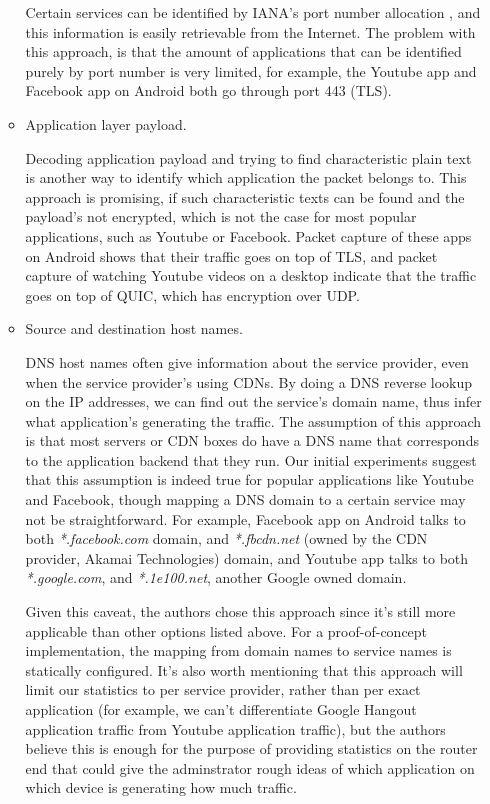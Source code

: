 \begin{itemize}
\begin{itemize}
  Certain services can be identified by IANA's port number allocation \cite{PortAssignment}, and this information is easily retrievable from the Internet. The problem with this approach, is that the amount of applications that can be identified purely by port number is very limited, for example, the Youtube app and Facebook app on Android both go through port 443 (TLS).

  \item Application layer payload. 

  Decoding application payload and trying to find characteristic plain text is another way to identify which application the packet belongs to. This approach is promising, if such characteristic texts can be found and the payload's not encrypted, which is not the case for most popular applications, such as Youtube or Facebook. Packet capture of these apps on Android shows that their traffic goes on top of TLS, and packet capture of watching Youtube videos on a desktop indicate that the traffic goes on top of QUIC, which has encryption over UDP.

  \item Source and destination host names. 

  DNS host names often give information about the service provider, even when the service provider's using CDNs. By doing a DNS reverse lookup on the IP addresses, we can find out the service's domain name, thus infer what application's generating the traffic. The assumption of this approach is that most servers or CDN boxes do have a DNS name that corresponds to the application backend that they run. Our initial experiments suggest that this assumption is indeed true for popular applications like Youtube and Facebook, though mapping a DNS domain to a certain service may not be straightforward. For example, Facebook app on Android talks to both \textit{*.facebook.com} domain, and \textit{*.fbcdn.net} (owned by the CDN provider, Akamai Technologies) domain, and Youtube app talks to both \textit{*.google.com}, and \textit{*.1e100.net}, another Google owned domain. 

  Given this caveat, the authors chose this approach since it's still more applicable than other options listed above. For a proof-of-concept implementation, the mapping from domain names to service names is statically configured. It's also worth mentioning that this approach will limit our statistics to per service provider, rather than per exact application (for example, we can't differentiate Google Hangout application traffic from Youtube application traffic), but the authors believe this is enough for the purpose of providing statistics on the router end that could give the adminstrator rough ideas of which application on which device is generating how much traffic.

  \end{itemize} 

\end{itemize}

